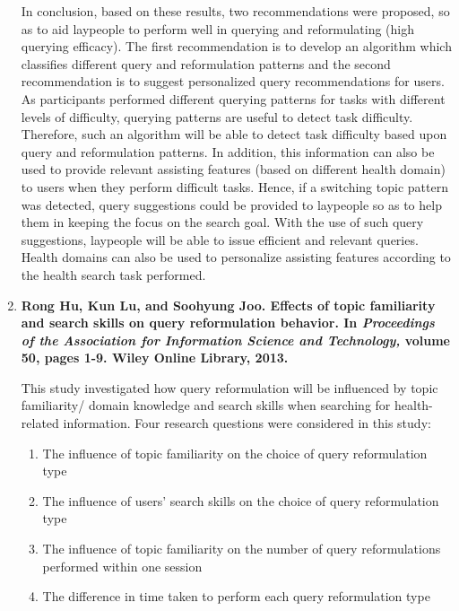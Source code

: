 \documentclass[]{article}
\begin{document}
\begin{enumerate}
In conclusion, based on these results, two recommendations were proposed, so as to aid laypeople to perform well in querying and reformulating (high querying efficacy). The first recommendation is to develop an algorithm which classifies different query and reformulation patterns and the second recommendation is to suggest personalized query recommendations for users. As participants performed different querying patterns for tasks with different levels of difficulty, querying patterns are useful to detect task difficulty. Therefore, such an algorithm will be able to detect task difficulty based upon query and reformulation patterns. In addition, this information can also be used to provide relevant assisting features (based on different health domain) to users when they perform difficult tasks. Hence, if a switching topic pattern was detected, query suggestions could be provided to laypeople so as to help them in keeping the focus on the search goal. With the use of such query suggestions, laypeople will be able to issue efficient and relevant queries. Health domains can also be used to personalize assisting features according to the health search task performed. \\     

\item {\textbf{Rong Hu, Kun Lu, and Soohyung Joo. Effects of topic familiarity and search skills on query reformulation behavior. In \textit{Proceedings of the Association for Information Science and Technology,} volume 50, pages 1-9. Wiley Online Library, 2013.}}

This study investigated how query reformulation will be influenced by topic familiarity/ domain knowledge and search skills when searching for health-related information. Four research questions were considered in this study:

\begin{enumerate}
	\item The influence of topic familiarity on the choice of query reformulation type 
	
	\item The influence of users' search skills on the choice of query reformulation type 
	
	\item The influence of topic familiarity on the number of query reformulations performed within one session 
	
	\item The difference in time taken to perform each query reformulation type 
\end{enumerate}


\end{enumerate}
\end{document}

